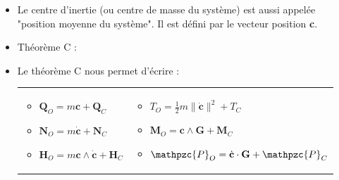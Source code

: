 \documentclass[a4paper]{article}
\begin{document}
\begin{itemize}
\item Le centre d'inertie (ou centre de masse du système) est aussi appelée "position moyenne du système". Il est défini par le vecteur position \textbf{c}.





\item Théorème C : 
\begin{center}
\end{center}





\item Le théorème C nous permet d'écrire : \\
\begin{tabular}{p{}p{}}
\begin{itemize}
\item $ \textbf{Q}_O = m \textbf{c} + \textbf{Q}_C $
\item $ \textbf{N}_O = m \dot{\textbf{c}} + \textbf{N}_C $
\item $ \textbf{H}_O = m \textbf{c} \wedge \dot{\textbf{c}} + \textbf{H}_C $
\end{itemize} & 
\begin{itemize}
\item $\displaystyle T_O = \frac{1}{2} m \| \dot{\textbf{c}} \|^2 + T_C $
\item $ \textbf{M}_O = \textbf{c} \wedge \textbf{G} + \textbf{M}_C $
\item $ \mathpzc{P}_O = \dot{\textbf{c}} \cdot \textbf{G} + \mathpzc{P}_C $
\end{itemize} \end{tabular}






\end{itemize}
\end{document}

